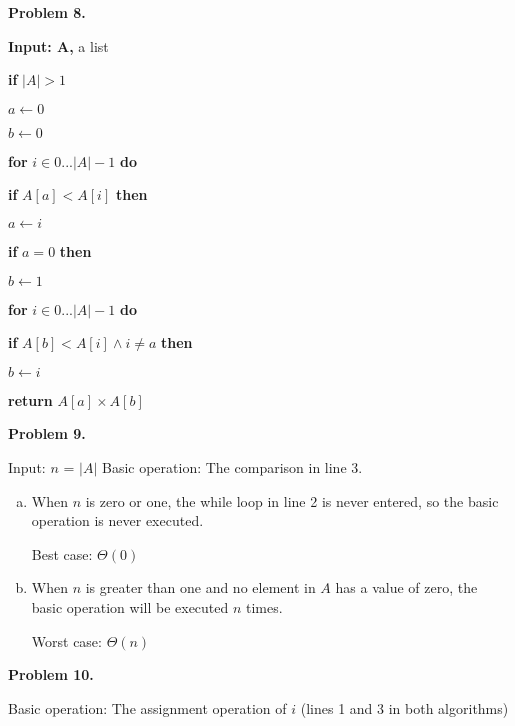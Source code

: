 \documentclass{article}
\begin{document}
\newpage

\textbf{Problem 8.}

\textbf{Input: A,} a list

\hspace{4ex}	\textbf{if} $|A| > 1$

\hspace{8ex}		$a \leftarrow 0$

\hspace{8ex}		$b \leftarrow 0$

\hspace{8ex}		\textbf{for} $i \in 0 ... |A| - 1$ \textbf{do}

\hspace{12ex}	 		\textbf{if} $A[a] < A[i]$ \textbf{then}

\hspace{16ex}				$a \leftarrow i$

\hspace{8ex}		\textbf{if} $a = 0$ \textbf{then}

\hspace{12ex}			$b \leftarrow 1$

\hspace{8ex}		\textbf{for} $i \in 0 ... |A| - 1$ \textbf{do}

\hspace{12ex}	 		\textbf{if} $A[b] < A[i] \wedge i \neq a$ \textbf{then}

\hspace{16ex}				$b \leftarrow i$

\hspace{8ex}		\textbf{return} $A[a] \times A[b]$

\textbf{Problem 9.}

	Input: $n$ = $|A|$
	Basic operation:  The comparison in line 3.

	\begin{enumerate}[a.]
		\item When $n$ is zero or one, the while loop in line 2 is never entered, so the basic operation is never executed.
		
			Best case: $\Theta(0)$
			
		\item When $n$ is greater than one and no element in $A$ has a value of zero, the basic operation will be executed $n$ times.
		
			Worst case: $\Theta(n)$
	\end{enumerate}

\textbf{Problem 10.}

	Basic operation: The assignment operation of $i$ (lines 1 and 3 in both algorithms)
	
\end{document}
